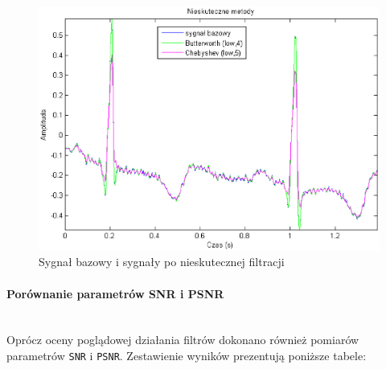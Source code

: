 \documentclass[a4paper, 11pt]{article}
\begin{document}
\begin{figure}[h]
\centering
\includegraphics[scale=0.8]{include/fig_nieskuteczne.eps}
\caption{Sygnał bazowy i sygnały po nieskutecznej filtracji}
\label{fig:fig_nieskuteczne}
\end{figure}

\paragraph{Porównanie parametrów SNR i PSNR}
\mbox{} \\
Oprócz oceny poglądowej działania filtrów dokonano również pomiarów parametrów \verb|SNR| i \verb|PSNR|. Zestawienie wyników prezentują poniższe tabele:
\end{document}
